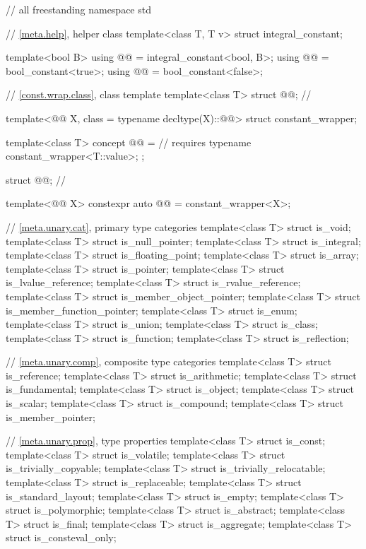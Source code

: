 %
\begin{codeblock}
// all freestanding
namespace std {
  // \ref{meta.help}, helper class
  template<class T, T v> struct integral_constant;

  template<bool B>
    using @@ = integral_constant<bool, B>;
  using @@  = bool_constant<true>;
  using @@ = bool_constant<false>;

  // \ref{const.wrap.class}, class template 
  template<class T>
    struct @@;                                      // \expos

  template<@@ X, class = typename decltype(X)::@@>
    struct constant_wrapper;

  template<class T>
    concept @@ =                                   // \expos
      requires { typename constant_wrapper<T::value>; };

  struct @@;                                          // \expos

  template<@@ X>
    constexpr auto @@ = constant_wrapper<X>{};

  // \ref{meta.unary.cat}, primary type categories
  template<class T> struct is_void;
  template<class T> struct is_null_pointer;
  template<class T> struct is_integral;
  template<class T> struct is_floating_point;
  template<class T> struct is_array;
  template<class T> struct is_pointer;
  template<class T> struct is_lvalue_reference;
  template<class T> struct is_rvalue_reference;
  template<class T> struct is_member_object_pointer;
  template<class T> struct is_member_function_pointer;
  template<class T> struct is_enum;
  template<class T> struct is_union;
  template<class T> struct is_class;
  template<class T> struct is_function;
  template<class T> struct is_reflection;

  // \ref{meta.unary.comp}, composite type categories
  template<class T> struct is_reference;
  template<class T> struct is_arithmetic;
  template<class T> struct is_fundamental;
  template<class T> struct is_object;
  template<class T> struct is_scalar;
  template<class T> struct is_compound;
  template<class T> struct is_member_pointer;

  // \ref{meta.unary.prop}, type properties
  template<class T> struct is_const;
  template<class T> struct is_volatile;
  template<class T> struct is_trivially_copyable;
  template<class T> struct is_trivially_relocatable;
  template<class T> struct is_replaceable;
  template<class T> struct is_standard_layout;
  template<class T> struct is_empty;
  template<class T> struct is_polymorphic;
  template<class T> struct is_abstract;
  template<class T> struct is_final;
  template<class T> struct is_aggregate;
  template<class T> struct is_consteval_only;

}
\end{codeblock}
